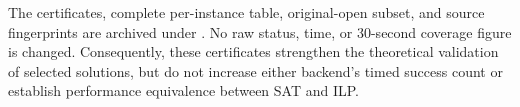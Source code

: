 The certificates, complete per-instance table, original-open subset,
and source fingerprints are archived under
.
No raw status, time, or 30-second coverage figure is changed. Consequently,
these certificates strengthen the theoretical validation of selected
solutions, but do not increase either backend's timed success count or
establish performance equivalence between SAT and ILP.
\FloatBarrier

